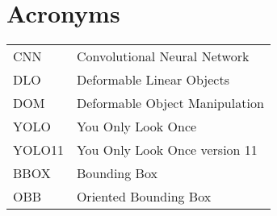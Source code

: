 

\chapter*{Acronyms}


\noindent
\begin{tabular}{ll} %
CNN & Convolutional Neural Network \\
DLO & Deformable Linear Objects \\
DOM & Deformable Object Manipulation \\
YOLO & You Only Look Once \\
YOLO11 & You Only Look Once version 11 \\
BBOX & Bounding Box \\
OBB  & Oriented Bounding Box \\
\end{tabular}